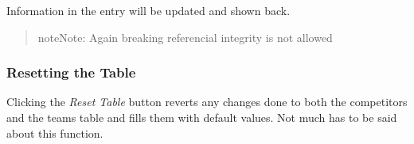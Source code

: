 \documentclass[a4paper,10pt,english]{sphinxmanual}
\begin{document}
Information in the entry will be updated and shown back.
\begin{quote}

\begin{notice}{note}{Note:}
Again breaking referencial integrity is not allowed
\end{notice}
\end{quote}


\subsubsection{Resetting the Table}
\label{user/member2:resetting-the-table}
Clicking the \emph{Reset Table} button reverts any changes done to both the competitors and the teams table and fills them with default values. Not much has to be said about this function.
\end{document}
